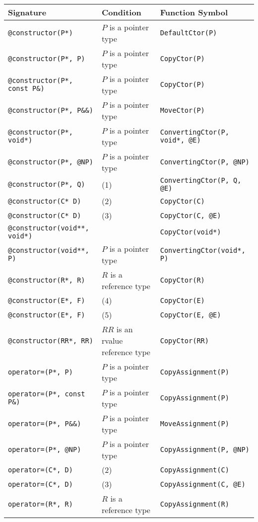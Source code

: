 \documentclass[a4paper,oneside,11pt]{book}
\theoremstyle{definition}
\begin{document}
\begin{flushleft}
\begin{supertabular}{lll}
\textbf{Signature}& \textbf{Condition}& \textbf{Function Symbol}\\
\hline
\verb|@constructor(P*)|& $P$ is a pointer type& \verb|DefaultCtor(P)|\\
\verb|@constructor(P*, P)|& $P$ is a pointer type& \verb|CopyCtor(P)|\\
\verb|@constructor(P*, const P&)|& $P$ is a pointer type& \verb|CopyCtor(P)|\\
\verb|@constructor(P*, P&&)|& $P$ is a pointer type & \verb|MoveCtor(P)|\\
\verb|@constructor(P*, void*)|& $P$ is a pointer type & \verb|ConvertingCtor(P, void*, @E)|\\
\verb|@constructor(P*, @NP)|& $P$ is a pointer type & \verb|ConvertingCtor(P, @NP)|\\
\verb|@constructor(P*, Q)|& (1)& \verb|ConvertingCtor(P, Q, @E)|\\
\verb|@constructor(C* D)|& (2)& \verb|CopyCtor(C)|\\
\verb|@constructor(C* D)|& (3)& \verb|CopyCtor(C, @E)|\\
\verb|@constructor(void**, void*)|& & \verb|CopyCtor(void*)|\\
\verb|@constructor(void**, P)|& $P$ is a pointer type & \verb|ConvertingCtor(void*, P)|\\
\verb|@constructor(R*, R)|& $R$ is a reference type& \verb|CopyCtor(R)|\\
\verb|@constructor(E*, F)|& (4)& \verb|CopyCtor(E)|\\
\verb|@constructor(E*, F)|& (5)& \verb|CopyCtor(E, @E)|\\
\verb|@constructor(RR*, RR)|& $RR$ is an rvalue reference type& \verb|CopyCtor(RR)|\\
\verb|operator=(P*, P)|& $P$ is a pointer type& \verb|CopyAssignment(P)|\\
\verb|operator=(P*, const P&)|& $P$ is a pointer type& \verb|CopyAssignment(P)|\\
\verb|operator=(P*, P&&)|& $P$ is a pointer type& \verb|MoveAssignment(P)|\\
\verb|operator=(P*, @NP)|& $P$ is a pointer type & \verb|CopyAssignment(P, @NP)|\\
\verb|operator=(C*, D)|& (2)& \verb|CopyAssignment(C)|\\
\verb|operator=(C*, D)|& (3)& \verb|CopyAssignment(C, @E)|\\
\verb|operator=(R*, R)|& $R$ is a reference type& \verb|CopyAssignment(R)|\\

\end{supertabular}
\end{flushleft}
\end{document}
